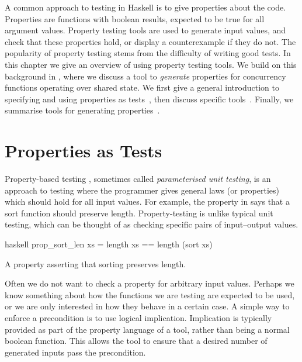 A common approach to testing in Haskell is to give properties about
the code.  Properties are functions with boolean results, expected to
be true for all argument values.  Property testing tools are used to
generate input values, and check that these properties hold, or
display a counterexample if they do not.  The popularity of property
testing stems from the difficulty of writing good tests.  In this
chapter we give an overview of using property testing tools.  We build
on this background in , where we discuss a tool to
\emph{generate} properties for concurrency functions operating over
shared state.  We first give a general introduction to specifying and
using properties as tests~, then discuss
specific tools~.  Finally, we summarise
tools for generating properties~.

\section{Properties as Tests}
\label{sec:property_testing-intro}

Property-based testing \parencite{claessen2000}, sometimes called
\emph{parameterised unit testing}, is an approach to testing where the
programmer gives general laws (or properties) which should hold for
all input values.  For example, the property in
 says that a sort function should preserve
length.  Property-testing is unlike typical unit testing, which can be
thought of as checking specific pairs of input--output values.

\begin{listing}
\centering
\begin{cminted}{haskell}
prop_sort_len xs = length xs == length (sort xs)
\end{cminted}
\caption{A property asserting that sorting preserves length.}\label{lst:prop_sort_len}
\end{listing}

Often we do not want to check a property for arbitrary input values.
Perhaps we know something about how the functions we are testing are
expected to be used, or we are only interested in how they behave in a
certain case.  A simple way to enforce a precondition is to use
logical implication.  Implication is typically provided as part of the
property language of a tool, rather than being a normal boolean
function.  This allows the tool to ensure that a desired number of
generated inputs pass the precondition.

